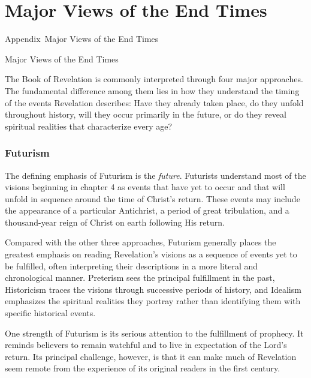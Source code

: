 {} 
\chapter*{Major Views of the End Times} 
%
         {Appendix~\thechapter\quad Major Views of the End Times}
 {\protect\numberline{\thechapter} Major Views of the End Times}


The Book of Revelation is commonly interpreted through four major approaches. The fundamental difference among them lies in how they understand the timing of the events Revelation describes: Have they already taken place, do they unfold throughout history, will they occur primarily in the future, or do they reveal spiritual realities that characterize every age?

\subsection*{Futurism}

The defining emphasis of Futurism is the \emph{future}. Futurists understand most of the visions beginning in chapter 4 as events that have yet to occur and that will unfold in sequence around the time of Christ's return. These events may include the appearance of a particular Antichrist, a period of great tribulation, and a thousand-year reign of Christ on earth following His return.

Compared with the other three approaches, Futurism generally places the greatest emphasis on reading Revelation's visions as a sequence of events yet to be fulfilled, often interpreting their descriptions in a more literal and chronological manner. Preterism sees the principal fulfillment in the past, Historicism traces the visions through successive periods of history, and Idealism emphasizes the spiritual realities they portray rather than identifying them with specific historical events.

One strength of Futurism is its serious attention to the fulfillment of prophecy. It reminds believers to remain watchful and to live in expectation of the Lord's return. Its principal challenge, however, is that it can make much of Revelation seem remote from the experience of its original readers in the first century.

